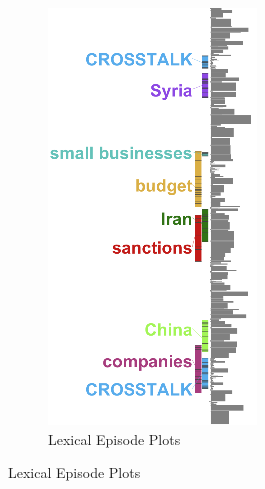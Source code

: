 \documentclass{l4proj}
\begin{document}
\begin{figure}
\begin{subfigure}[c]{0.2\textwidth}
        \includegraphics[width=\linewidth]{images/document_visualization/topic-overview.png}
        \caption{Lexical Episode Plots}
        \label{fig:lexical_plot}
    \end{subfigure}
    \hspace{0.01\textwidth}

\end{figure}
\end{document}
